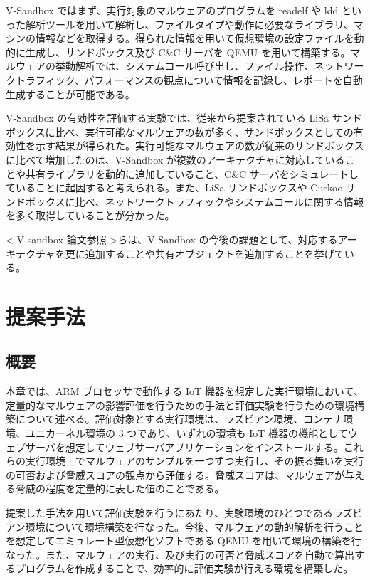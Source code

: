 \documentclass[12pt,a4paper,titlepage,report]{jsbook}
\begin{document}
V-Sandbox ではまず、実行対象のマルウェアのプログラムを readelf や ldd といった解析ツールを用いて解析し、ファイルタイプや動作に必要なライブラリ、マシンの情報などを取得する。得られた情報を用いて仮想環境の設定ファイルを動的に生成し、サンドボックス及び C\&C サーバを QEMU を用いて構築する。マルウェアの挙動解析では、システムコール呼び出し、ファイル操作、ネットワークトラフィック、パフォーマンスの観点について情報を記録し、レポートを自動生成することが可能である。

V-Sandbox の有効性を評価する実験では、従来から提案されている LiSa サンドボックスに比べ、実行可能なマルウェアの数が多く、サンドボックスとしての有効性を示す結果が得られた。実行可能なマルウェアの数が従来のサンドボックスに比べて増加したのは、V-Sandbox が複数のアーキテクチャに対応していることや共有ライブラリを動的に追加していること、C\&C サーバをシミュレートしていることに起因すると考えられる。また、LiSa サンドボックスや Cuckoo サンドボックスに比べ、ネットワークトラフィックやシステムコールに関する情報を多く取得していることが分かった。

< V-sandbox 論文参照 >らは、V-Sandbox の今後の課題として、対応するアーキテクチャを更に追加することや共有オブジェクトを追加することを挙げている。

\chapter{提案手法}
\section{概要}
本章では、ARM プロセッサで動作する IoT 機器を想定した実行環境において、定量的なマルウェアの影響評価を行うための手法と評価実験を行うための環境構築について述べる。評価対象とする実行環境は、ラズビアン環境、コンテナ環境、ユニカーネル環境の 3 つであり、いずれの環境も IoT 機器の機能としてウェブサーバを想定してウェブサーバアプリケーションをインストールする。これらの実行環境上でマルウェアのサンプルを一つずつ実行し、その振る舞いを実行の可否および脅威スコアの観点から評価する。脅威スコアは、マルウェアが与える脅威の程度を定量的に表した値のことである。

提案した手法を用いて評価実験を行うにあたり、実験環境のひとつであるラズビアン環境について環境構築を行なった。今後、マルウェアの動的解析を行うことを想定してエミュレート型仮想化ソフトである QEMU を用いて環境の構築を行なった。また、マルウェアの実行、及び実行の可否と脅威スコアを自動で算出するプログラムを作成することで、効率的に評価実験が行える環境を構築した。
\end{document}
